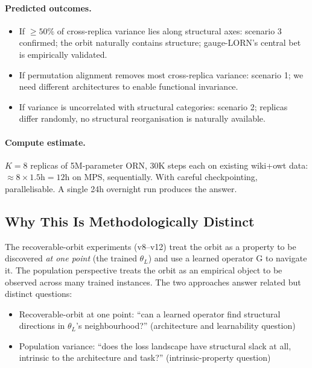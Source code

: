 \documentclass[11pt, a4paper]{article}
\theoremstyle{plain}
\theoremstyle{definition}
\theoremstyle{remark}
\begin{document}
\paragraph{Predicted outcomes.}
\begin{itemize}[nosep]
\item If $\geq 50\%$ of cross-replica variance lies along structural axes: scenario 3 confirmed; the orbit naturally contains structure; gauge-LORN's central bet is empirically validated.
\item If permutation alignment removes most cross-replica variance: scenario 1; we need different architectures to enable functional invariance.
\item If variance is uncorrelated with structural categories: scenario 2; replicas differ randomly, no structural reorganisation is naturally available.
\end{itemize}

\paragraph{Compute estimate.}
$K = 8$ replicas of 5M-parameter ORN, 30K steps each on existing wiki+owt data: $\approx 8 \times 1.5\text{h} = 12$h on MPS, sequentially.
With careful checkpointing, parallelisable.
A single 24h overnight run produces the answer.

\subsection{Why This Is Methodologically Distinct}

The recoverable-orbit experiments (v8--v12) treat the orbit as a property to be discovered \emph{at one point} (the trained $\theta_L$) and use a learned operator G to navigate it.
The population perspective treats the orbit as an empirical object to be observed across many trained instances.
The two approaches answer related but distinct questions:

\begin{itemize}[nosep]
\item Recoverable-orbit at one point: ``can a learned operator find structural directions in $\theta_L$'s neighbourhood?'' (architecture and learnability question)
\item Population variance: ``does the loss landscape have structural slack at all, intrinsic to the architecture and task?'' (intrinsic-property question)
\end{itemize}
\end{document}
